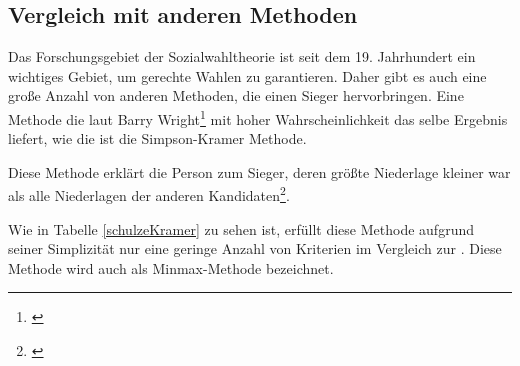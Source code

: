 \subsection{Vergleich mit anderen Methoden}
\label{sec:alternativeAlgorithmen}

Das Forschungsgebiet der Sozialwahltheorie ist seit dem 19. Jahrhundert ein wichtiges Gebiet, um gerechte Wahlen zu garantieren. Daher gibt es auch eine große Anzahl von anderen Methoden, die einen Sieger hervorbringen. Eine Methode die laut Barry Wright\footnote{\Vgl \citet{Wright2009}} mit hoher Wahrscheinlichkeit das selbe Ergebnis liefert, wie die \schulze ist die Simpson-Kramer Methode.

Diese Methode erklärt die Person zum Sieger, deren größte Niederlage kleiner war als alle Niederlagen der anderen Kandidaten\footnote{\Vgl \citet{Nurmi2017}}.  

Wie in Tabelle \ref{schulzeKramer} zu sehen ist, erfüllt diese Methode aufgrund seiner Simplizität nur eine geringe Anzahl von Kriterien im Vergleich zur \schulze. Diese Methode wird auch als Minmax-Methode bezeichnet.

